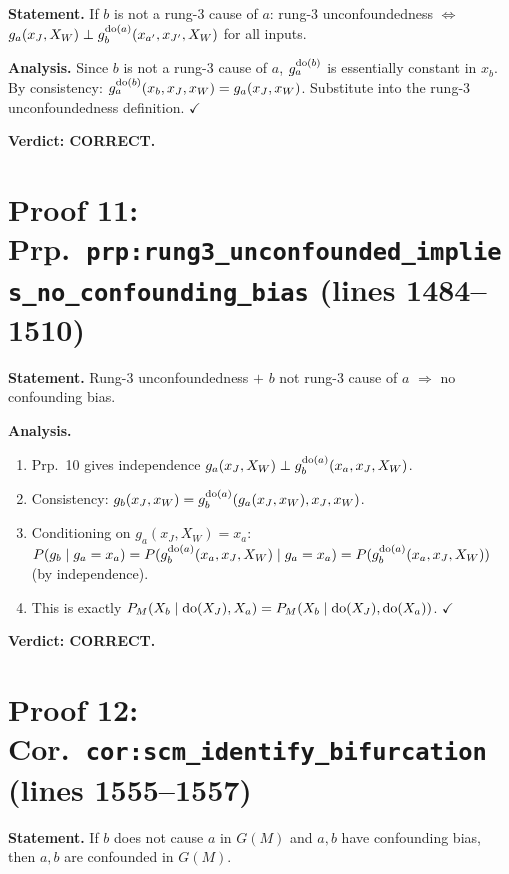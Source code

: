 \documentclass{article}
\begin{document}
\textbf{Statement.} If $b$ is not a rung-3 cause of $a$: rung-3 unconfoundedness
$\iff$ $g_a(x_J,X_W)\perp g^{\operatorname{do}(a)}_b(x_{a'},x_{J'},X_W)$ for all inputs.

\textbf{Analysis.}
Since $b$ is not a rung-3 cause of $a$, $g^{\operatorname{do}(b)}_a$ is essentially
constant in $x_b$.  By consistency: $g^{\operatorname{do}(b)}_a(x_b,x_J,x_W)=g_a(x_J,x_W)$.
Substitute into the rung-3 unconfoundedness definition.  $\checkmark$

\textbf{Verdict: CORRECT.}

\section{Proof 11: Prp.\ \texttt{prp:rung3\_unconfounded\_implies\_no\_confounding\_bias}
(lines 1484--1510)}

\textbf{Statement.} Rung-3 unconfoundedness $+$ $b$ not rung-3 cause of $a$
$\Rightarrow$ no confounding bias.

\textbf{Analysis.}
\begin{enumerate}[leftmargin=*]
  \item Prp.~10 gives independence $g_a(x_J,X_W)\perp g^{\operatorname{do}(a)}_b(x_a,x_J,X_W)$.
  \item Consistency: $g_b(x_J,x_W)=g^{\operatorname{do}(a)}_b(g_a(x_J,x_W),x_J,x_W)$.
  \item Conditioning on $g_a(x_J,X_W)=x_a$:
    $P(g_b\mid g_a=x_a) = P(g^{\operatorname{do}(a)}_b(x_a,x_J,X_W)\mid g_a=x_a)
    = P(g^{\operatorname{do}(a)}_b(x_a,x_J,X_W))$
    (by independence).
  \item This is exactly $P_M(X_b\mid\operatorname{do}(X_J),X_a)=P_M(X_b\mid\operatorname{do}(X_J),\operatorname{do}(X_a))$.
    $\checkmark$
\end{enumerate}

\textbf{Verdict: CORRECT.}

\section{Proof 12: Cor.\ \texttt{cor:scm\_identify\_bifurcation}
(lines 1555--1557)}

\textbf{Statement.} If $b$ does not cause $a$ in $G(M)$ and $a,b$ have
confounding bias, then $a,b$ are confounded in $G(M)$.
\end{document}
